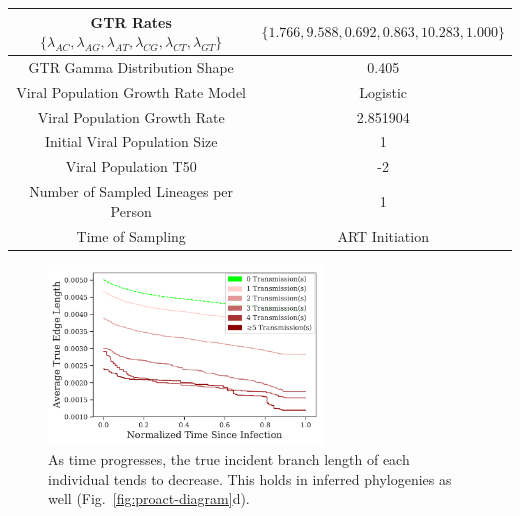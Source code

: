 \begin{table}[!ht]
\begin{center}
\begin{tabular}{|c|c|}
\hline
\gls{GTR} Rates $\{\lambda_{AC},\lambda_{AG},\lambda_{AT},\lambda_{CG},\lambda_{CT},\lambda_{GT}\}$ & $\{1.766,9.588,0.692,0.863,10.283,1.000\}$\\
\hline
\gls{GTR} Gamma Distribution Shape & 0.405\\
\hline
Viral Population Growth Rate Model & Logistic\\
\hline
Viral Population Growth Rate & 2.851904\\
\hline
Initial Viral Population Size & 1\\
\hline
Viral Population T50 & -2\\
\hline
Number of Sampled Lineages per Person & 1\\
\hline
Time of Sampling & \gls{ART} Initiation\\
\hline
\end{tabular}
\end{center}
\label{tab:proact-config-file}
\end{table}

\begin{figure} %
\centering
\includegraphics[width=0.65\textwidth]{figs/proact-true-bl-vs-time}
\caption[ProACT Diagram]
{As time progresses, the true incident branch length of each individual tends to decrease. This holds in inferred phylogenies as well (Fig.~\ref{fig:proact-diagram}d).}
\label{fig:proact-true-bl-vs-time}
\end{figure}


